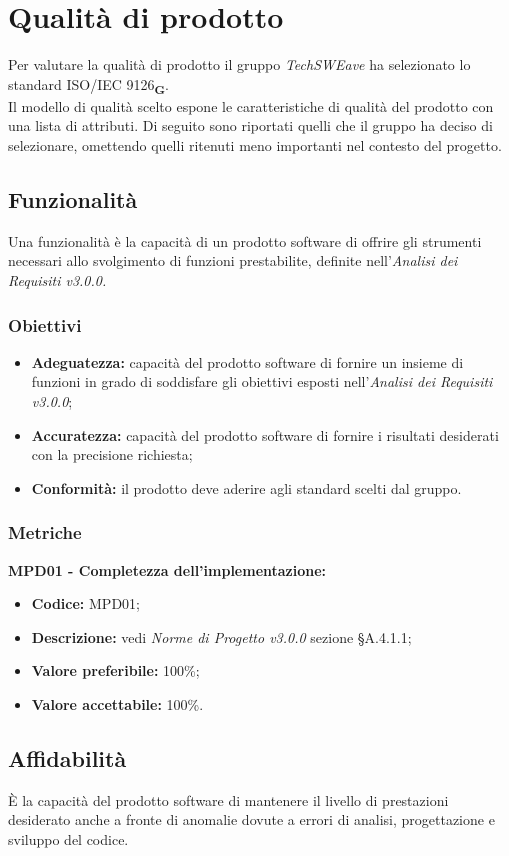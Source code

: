 \section{Qualità di prodotto}
Per valutare la qualità di prodotto il gruppo  \textit{TechSWEave} ha selezionato lo standard ISO/IEC 9126\textsubscript{\textbf{G}}.\\
Il modello di qualità scelto espone le caratteristiche di qualità del prodotto con una lista di attributi. Di seguito sono riportati quelli che il
gruppo ha deciso di selezionare, omettendo quelli ritenuti meno importanti nel contesto del progetto.
\subsection{Funzionalità}
Una funzionalità è la capacità di un prodotto software di offrire gli strumenti necessari allo svolgimento di funzioni prestabilite, definite
nell'\textit{Analisi dei Requisiti v3.0.0.}
\subsubsection{Obiettivi}
\begin{itemize}
    \item \textbf{Adeguatezza:} capacità del prodotto software di fornire un insieme di funzioni in grado
          di soddisfare gli obiettivi esposti nell’\textit{Analisi dei Requisiti v3.0.0};
    \item \textbf{Accuratezza:} capacità del prodotto software di fornire i risultati desiderati con la precisione richiesta;
    \item \textbf{Conformità:} il prodotto deve aderire agli standard scelti dal gruppo.
\end{itemize}
\subsubsection{Metriche}
\textbf{MPD01 - Completezza dell'implementazione:}
\begin{itemize}
    \item \textbf{Codice:} MPD01;
    \item \textbf{Descrizione:} vedi \textit{Norme di Progetto v3.0.0} sezione \S A.4.1.1;
    \item \textbf{Valore preferibile:} 100\%;
    \item \textbf{Valore accettabile:} 100\%.
\end{itemize}
\subsection{Affidabilità}
È la capacità del prodotto software di mantenere il livello di prestazioni
desiderato anche a fronte di anomalie dovute a errori di analisi, progettazione e sviluppo del codice.
